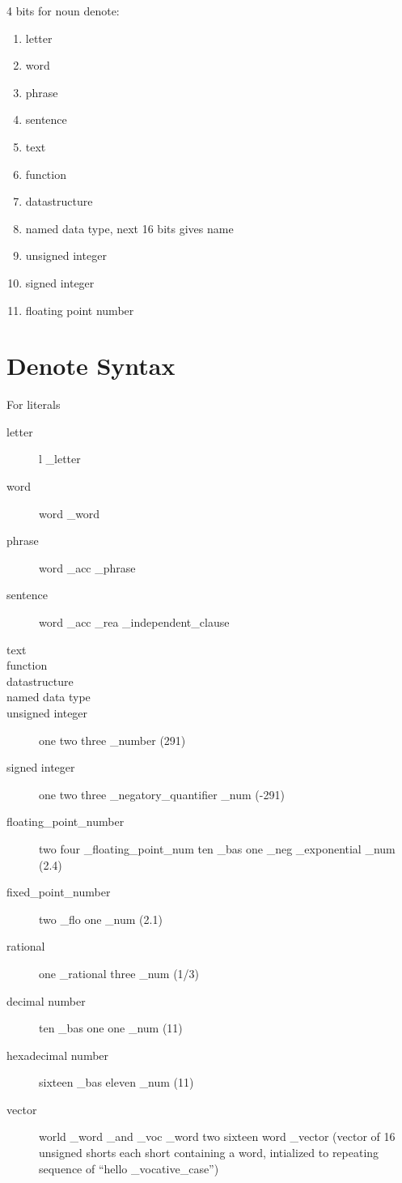 \documentclass[12pt]{report}
\begin{document}
4 bits for noun denote:
\begin{enumerate}
  \setcounter{enumi}{0}
  \item letter
  \item word
  \item phrase
  \item sentence
  \item text
  \item function
  \item datastructure
  \item named data type, next 16 bits gives name
  \item unsigned integer
  \item signed integer
  \item floating point number
\end{enumerate}
\section{Denote Syntax}
For literals
\begin{description}
  \item[letter] l \_letter
  \item[word] word \_word
  \item[phrase] word \_acc \_phrase
  \item[sentence] word \_acc \_rea \_independent\_clause
  \item[text] 
  \item[function]
  \item[datastructure]
  \item[named data type]
  \item[unsigned integer] one two three \_number (291)
  \item[signed integer] one two three \_negatory\_quantifier \_num
(-291)
  \item[floating\_point\_number] two four \_floating\_point\_num ten \_bas
one \_neg \_exponential \_num (2.4)
  \item[fixed\_point\_number] two \_flo one \_num (2.1)
  \item[rational] one \_rational three \_num (1/3)
  \item[decimal number] ten \_bas  one one \_num (11)
  \item[hexadecimal number] sixteen \_bas eleven \_num (11)
  \item[vector] world \_word \_and \_voc \_word two sixteen word \_vector (vector of 16
unsigned shorts each short containing a word, intialized to repeating sequence
of ``hello \_vocative\_case'')
\end{description}
\end{document}
